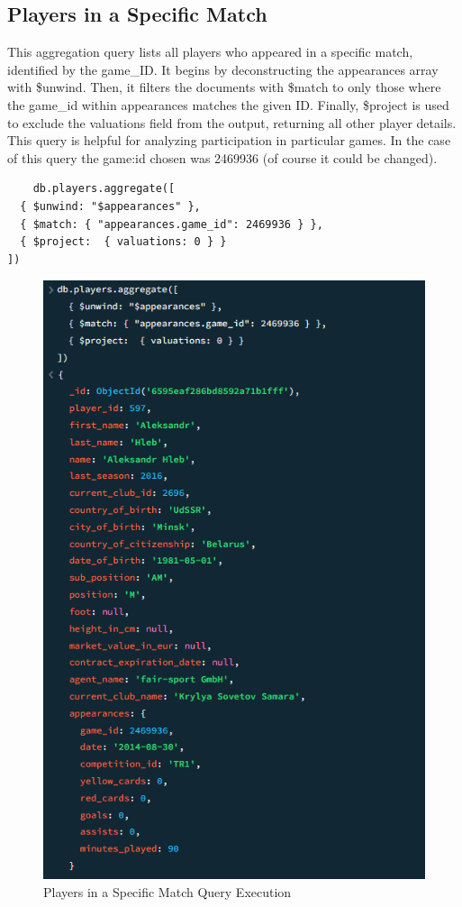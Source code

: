 \documentclass{Configuration_Files/PoliMi3i_thesis}
\begin{document}
\subsection{Players in a Specific Match}
This aggregation query lists all players who appeared in a specific match, identified by the game\_ID. It begins by deconstructing the appearances array with \$unwind. Then, it filters the documents with \$match to only those where the game\_id within appearances matches the given ID. Finally, \$project is used to exclude the valuations field from the output, returning all other player details. This query is helpful for analyzing participation in particular games. In the case of this query the game:id chosen was 2469936 (of course it could be changed).

\begin{verbatim}
    db.players.aggregate([
  { $unwind: "$appearances" },
  { $match: { "appearances.game_id": 2469936 } },
  { $project:  { valuations: 0 } }
])
\end{verbatim}
\begin{figure}[htbp]
    \centering
    \includegraphics[scale=1]{Images/Queries/Players_in_game/pg.png}
    \caption{Players in a Specific Match Query Execution}
\end{figure}
\end{document}
